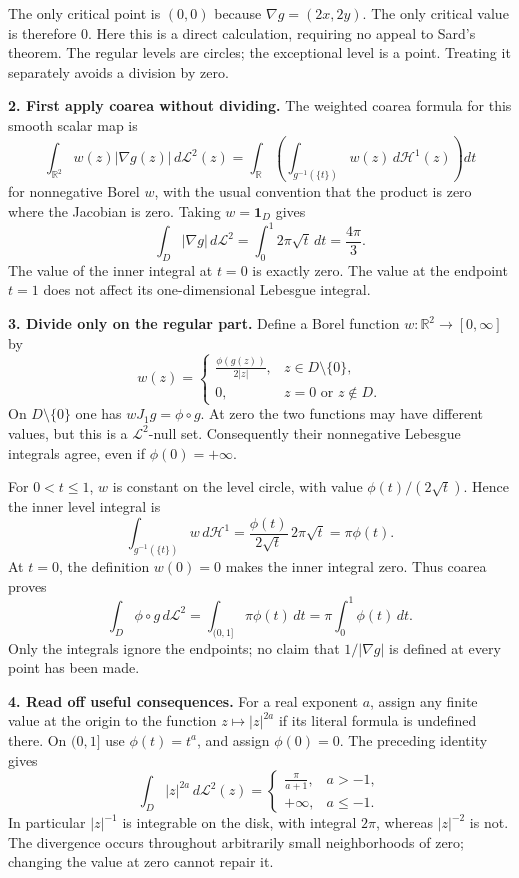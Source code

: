 \documentclass[
  11pt,
]{article}
\begin{document}
The only critical point is \((0,0)\) because \(\nabla g=(2x,2y)\). The
only critical value is therefore \(0\). Here this is a direct
calculation, requiring no appeal to Sard's theorem. The regular levels
are circles; the exceptional level is a point. Treating it separately
avoids a division by zero.

\textbf{2. First apply coarea without dividing.} The weighted coarea
formula for this smooth scalar map is \[
\int_{\mathbb R^2}w(z)|\nabla g(z)|\,d\mathcal L^2(z)
=\int_{\mathbb R}\left(\int_{g^{-1}(\{t\})}w(z)\,d\mathcal H^1(z)\right)dt
\] for nonnegative Borel \(w\), with the usual convention that the
product is zero where the Jacobian is zero. Taking \(w=\mathbf1_D\)
gives \[
\int_D|\nabla g|\,d\mathcal L^2
=\int_0^1 2\pi\sqrt t\,dt
=\frac{4\pi}{3}.
\] The value of the inner integral at \(t=0\) is exactly zero. The value
at the endpoint \(t=1\) does not affect its one-dimensional Lebesgue
integral.

\textbf{3. Divide only on the regular part.} Define a Borel function
\(w:\mathbb R^2\to[0,\infty]\) by \[
w(z)=
\begin{cases}
\displaystyle\frac{\phi(g(z))}{2|z|},&z\in D\setminus\{0\},\\[4pt]
0,&z=0\text{ or }z\notin D.
\end{cases}
\] On \(D\setminus\{0\}\) one has \(wJ_1g=\phi\circ g\). At zero the two
functions may have different values, but this is a \(\mathcal L^2\)-null
set. Consequently their nonnegative Lebesgue integrals agree, even if
\(\phi(0)=+\infty\).

For \(0<t\leq1\), \(w\) is constant on the level circle, with value
\(\phi(t)/(2\sqrt t)\). Hence the inner level integral is \[
\int_{g^{-1}(\{t\})}w\,d\mathcal H^1
=\frac{\phi(t)}{2\sqrt t}\,2\pi\sqrt t
=\pi\phi(t).
\] At \(t=0\), the definition \(w(0)=0\) makes the inner integral zero.
Thus coarea proves \[
\int_D\phi\circ g\,d\mathcal L^2
=\int_{(0,1]}\pi\phi(t)\,dt
=\pi\int_0^1\phi(t)\,dt.
\] Only the integrals ignore the endpoints; no claim that
\(1/|\nabla g|\) is defined at every point has been made.

\textbf{4. Read off useful consequences.} For a real exponent \(a\),
assign any finite value at the origin to the function
\(z\mapsto|z|^{2a}\) if its literal formula is undefined there. On
\((0,1]\) use \(\phi(t)=t^a\), and assign \(\phi(0)=0\). The preceding
identity gives \[
\int_D|z|^{2a}\,d\mathcal L^2(z)
=\begin{cases}
\displaystyle\frac{\pi}{a+1},&a>-1,\\[4pt]
+\infty,&a\leq-1.
\end{cases}
\] In particular \(|z|^{-1}\) is integrable on the disk, with integral
\(2\pi\), whereas \(|z|^{-2}\) is not. The divergence occurs throughout
arbitrarily small neighborhoods of zero; changing the value at zero
cannot repair it.
\end{document}
